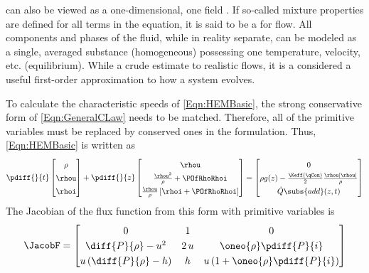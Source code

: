  can also be viewed as a one-dimensional, one field \CLaw.
If so-called mixture properties are defined for all terms in the equation, it is said to be a  for flow.
All components and phases of the fluid, while in reality separate, can be modeled as a single, averaged substance (homogeneous) possessing one temperature, velocity, etc. (equilibrium).
While a crude estimate to realistic flows, it is a considered a useful first-order approximation to how a \THs system evolves.

To calculate the characteristic speeds of \cref{Eqn:HEMBasic}, the strong conservative form of \cref{Eqn:GeneralCLaw} needs to be matched.
Therefore, all of the primitive variables must be replaced by conserved ones in the formulation.
Thus, \cref{Eqn:HEMBasic} is written as 
\begin{equation}
    \renewcommand*{\arraystretch}{1.4}
    \pdiff{}{t}\begin{bmatrix}
                   \rho \\
                   \rhou \\
                   \rhoi 
                \end{bmatrix}
    + 
    \pdiff{}{z}\begin{bmatrix}
                    \rhou                 \\
                   \frac{\rhou^2}{\rho} + \POfRhoRhoi   \\
                    \frac{\rhou}{\rho}\left[\rhoi  + \POfRhoRhoi\right]
                \end{bmatrix}
             =  
    \begin{bmatrix}
        0 \\%
        \rho{g(z)} - \frac{\Keff(\qCon)}{2} \frac{\rhou |\rhou|}{\rho}  \\
        \dot{Q}\subs{add}(z,t)
    \end{bmatrix}
    \label{Eqn:HEMStrongConservative}
\end{equation}
The Jacobian of the flux function from this form with primitive variables is
\begin{equation}
    \renewcommand*{\arraystretch}{1.25}
    \JacobF = 
    \begin{bmatrix}
        0 & 1 & 0 \\
        \diff{P}{\rho} - u^2 & 2\,u & \oneo{\rho}\pdiff{P}{i} \\
        u \left(\diff{P}{\rho} - h\right) & h & u\left(1 + \oneo{\rho}\pdiff{P}{i}\right) 
    \end{bmatrix}
    \label{Eqn:FluxJacobianHEM}
\end{equation}
